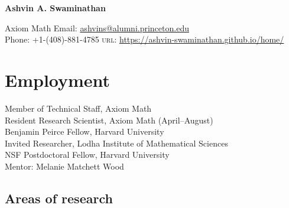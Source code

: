 \documentclass[11pt]{article} %
\begin{document}

{\vspace*{-0.4in}\LARGE\bfseries Ashvin A. Swaminathan} %
\bigskip %

Axiom Math \hspace*{\fill} Email: \href{mailto:ashvins@alumni.princeton.edu}{ashvins@alumni.princeton.edu}\\ %
Phone: +1-(408)-881-4785 \hspace*{\fill} \textsc{url}: \href{https://ashvin-swaminathan.github.io/home/}{https://ashvin-swaminathan.github.io/home/}




\vspace*{-3pt}
\section*{Employment}

 Member of Technical Staff, Axiom Math \\
 Resident Research Scientist, Axiom Math (April--August) \\
 Benjamin Peirce Fellow, Harvard University \\
 Invited Researcher, Lodha Institute of Mathematical Sciences
\\
 NSF Postdoctoral Fellow, Harvard University \\
Mentor: Melanie Matchett Wood %

\vspace*{-3pt}

\subsection*{Areas of research}
\end{document}
